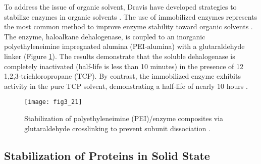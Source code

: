 \begin{refsection}
To address the issue of organic solvent, Dravis  have developed
strategies to stabilize enzymes in organic solvents \cite{Dravis2001}. The use
of immobilized enzymes represents the most common method to improve enzyme
stability toward organic solvents \cite{Koudelakova2013,Dravis2001}. The
enzyme, haloalkane dehalogenase, is coupled to an inorganic polyethyleneimine
impregnated alumina (PEI-alumina) with a glutaraldehyde linker (Figure
\ref{fig:pei}). The results demonstrate that the soluble dehalogenase is
completely inactivated (half-life is less than 10 minutes) in the presence of
\SI{12}{\milli\Molar} 1,2,3-trichloropropane (TCP). By contrast, the
immobilized enzyme exhibits activity in the pure TCP solvent, demonstrating a
half-life of nearly 10 hours \cite{Dravis2001}.
\begin{figure}[htbp] \centering \texttt{[image: fig3\_21]}
    \caption[Stabilization of polyethyleneimine(PEI)/enzyme composites via
    glutaraldehyde crosslinking to prevent subunit dissociation.]{Stabilization
    of polyethyleneimine (PEI)/enzyme composites via glutaraldehyde
    crosslinking to prevent subunit dissociation \cite{Barbosa2014}.}
    \label{fig:pei}
\end{figure}

\subsection{Stabilization of Proteins in Solid State}


\end{refsection}
